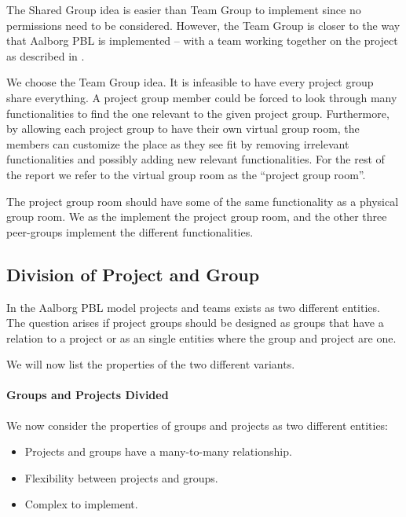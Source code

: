 The Shared Group idea is easier than Team Group to implement since no permissions need to be considered.
However, the Team Group is closer to the way that Aalborg PBL is implemented -- with a team working together on the project as described in .

We choose the Team Group idea. 
It is infeasible to have every project group share everything.
A project group member could be forced to look through many functionalities to find the one relevant to the given project group.
Furthermore, by allowing each project group to have their own virtual group room, the members can customize the place as they see fit by removing irrelevant functionalities and possibly adding new relevant functionalities.
For the rest of the report we refer to the virtual group room as the ``project group room''.

The project group room should have some of the same functionality as a physical group room.
We as the \groupname{} implement the project group room, and the other three peer-groups implement the different functionalities.


\subsection{Division of Project and Group}
\label{sub:divProjGroup}
In the Aalborg PBL model projects and teams exists as two different entities. 
The question arises if project groups should be designed as groups that have a relation to a project or as an single entities where the group and project are one. 

We will now list the properties of the two different variants. 

\paragraph{Groups and Projects Divided} We now consider the properties of groups and projects as two different entities:
\begin{itemize}
	\item Projects and groups have a many-to-many relationship.
	\item Flexibility between projects and groups.
	\item Complex to implement.
\end{itemize}


